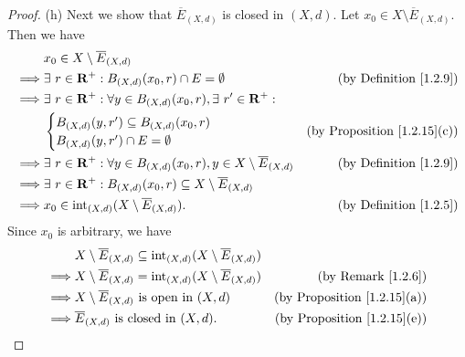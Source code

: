 \begin{proof}{(h)}
    Next we show that \(\overline{E}_{(X, d)}\) is closed in \((X, d)\).
    Let \(x_0 \in X \setminus \overline{E}_{(X, d)}\).
    Then we have
    \begin{align*}
                 & x_0 \in X \setminus \overline{E}_{(X, d)}                                                                                            \\
        \implies & \exists\ r \in \mathbf{R}^+ : B_{(X, d)}(x_0, r) \cap E = \emptyset                                     & \text{(by Definition \ref{1.2.9})} \\
        \implies & \exists\ r \in \mathbf{R}^+ : \forall y \in B_{(X, d)}(x_0, r), \exists\ r' \in \mathbf{R}^+ :                                                       \\
                 & \begin{cases}
                       B_{(X, d)}(y, r') \subseteq B_{(X, d)}(x_0, r) \\
                       B_{(X, d)}(y, r') \cap E = \emptyset
                   \end{cases}                                               & \text{(by Proposition \ref{1.2.15}(c))}                                  \\
        \implies & \exists\ r \in \mathbf{R}^+ : \forall y \in B_{(X, d)}(x_0, r), y \in X \setminus \overline{E}_{(X, d)} & \text{(by Definition \ref{1.2.9})} \\
        \implies & \exists\ r \in \mathbf{R}^+ : B_{(X, d)}(x_0, r) \subseteq X \setminus \overline{E}_{(X, d)}                                                 \\
        \implies & x_0 \in \text{int}_{(X, d)}(X \setminus \overline{E}_{(X, d)}).                                 & \text{(by Definition \ref{1.2.5})}
    \end{align*}
    Since \(x_0\) is arbitrary, we have
    \begin{align*}
                 & X \setminus \overline{E}_{(X, d)} \subseteq \text{int}_{(X, d)}(X \setminus \overline{E}_{(X, d)})                                           \\
        \implies & X \setminus \overline{E}_{(X, d)} = \text{int}_{(X, d)}(X \setminus \overline{E}_{(X, d)})         & \text{(by Remark \ref{1.2.6})}          \\
        \implies & X \setminus \overline{E}_{(X, d)} \text{ is open in } (X, d)                                       & \text{(by Proposition \ref{1.2.15}(a))} \\
        \implies & \overline{E}_{(X, d)} \text{ is closed in } (X, d).                                                & \text{(by Proposition \ref{1.2.15}(e))}
    \end{align*}


\end{proof}

